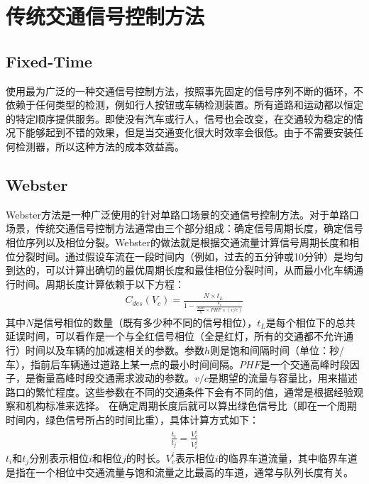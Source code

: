 \section{传统交通信号控制方法}
\subsection{Fixed-Time}
使用最为广泛的一种交通信号控制方法，按照事先固定的信号序列不断的循环，不依赖于任何类型的检测，例如行人按钮或车辆检测装置。所有道路和运动都以恒定的特定顺序提供服务。即使没有汽车或行人，信号也会改变，在交通较为稳定的情况下能够起到不错的效果，但是当交通变化很大时效率会很低。由于不需要安装任何检测器，所以这种方法的成本效益高。

\subsection{Webster}
Webster方法是一种广泛使用的针对单路口场景的交通信号控制方法。对于单路口场景，传统交通信号控制方法通常由三个部分组成：确定信号周期长度，确定信号相位序列以及相位分裂。Webster的做法就是根据交通流量计算信号周期长度和相位分裂时间。通过假设车流在一段时间内（例如，过去的五分钟或10分钟）是均匀到达的，可以计算出确切的最优周期长度和最佳相位分裂时间，从而最小化车辆通行时间。周期长度计算依赖于以下方程：
\begin{align}
    C_{d e s}\left(V_{c}\right)=\frac{N \times t_{L}}{1-\frac{V_{c}}{\frac{3600}{h} \times P H F \times(v / c)}}
\end{align}
其中$N$是信号相位的数量（既有多少种不同的信号相位），$t_{L}$是每个相位下的总共延误时间，可以看作是一个与全红信号相位（全是红灯，所有的交通都不允许通行）时间以及车辆的加减速相关的参数。参数$h$则是饱和间隔时间（单位：秒/车），指前后车辆通过道路上某一点的最小时间间隔。$PHF$是一个交通高峰时段因子，是衡量高峰时段交通需求波动的参数。$v / c$是期望的流量与容量比，用来描述路口的繁忙程度。这些参数在不同的交通条件下会有不同的值，通常是根据经验观察和机构标准来选择。
在确定周期长度后就可以算出绿色信号比（即在一个周期时间内，绿色信号所占的时间比重），具体计算方式如下：
\begin{align}
    \frac{t_{i}}{t_{j}}=\frac{V_{c}^{i}}{V_{c}^{j}}
\end{align}
$t_i \text{和} t_j$分别表示相位$i$和相位$j$的时长。$V_c^i$表示相位$i$的临界车道流量，其中临界车道是指在一个相位中交通流量与饱和流量之比最高的车道，通常与队列长度有关。

